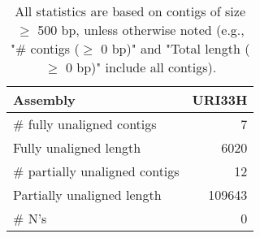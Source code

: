 \documentclass[12pt,a4paper]{article}
\begin{document}
\begin{table}[ht]
\begin{center}
\caption{All statistics are based on contigs of size $\geq$ 500 bp, unless otherwise noted (e.g., "\# contigs ($\geq$ 0 bp)" and "Total length ($\geq$ 0 bp)" include all contigs).}
\begin{tabular}{|l*{1}{|r}|}
\hline
Assembly & URI33H \\ \hline
\# fully unaligned contigs & 7 \\ \hline
Fully unaligned length & 6020 \\ \hline
\# partially unaligned contigs & 12 \\ \hline
Partially unaligned length & 109643 \\ \hline
\# N's & 0 \\ \hline
\end{tabular}
\end{center}
\end{table}
\end{document}
